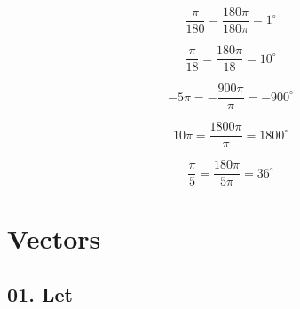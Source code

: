 \documentclass[12pt, a4paper]{article}
\begin{document}
\begin{equation}
	\tag{f}
	\frac{\pi}{180} = \frac{180\pi}{180\pi} = 1^\circ
\end{equation}

\begin{equation}
	\tag{g}
	\frac{\pi}{18} = \frac{180\pi}{18} = 10^\circ
\end{equation}

\begin{equation}
	\tag{h}
	-5\pi = -\frac{900\pi}{\pi} = -900^\circ
\end{equation}

\begin{equation}
	\tag{i}
	10\pi = \frac{1800\pi}{\pi} = 1800^\circ
\end{equation}

\begin{equation}
	\tag{j}
	\frac{\pi}{5} = \frac{180\pi}{5\pi} = 36^\circ 
\end{equation}

\newpage


\section*{Vectors}

\subsection*{01. Let}
\end{document}

